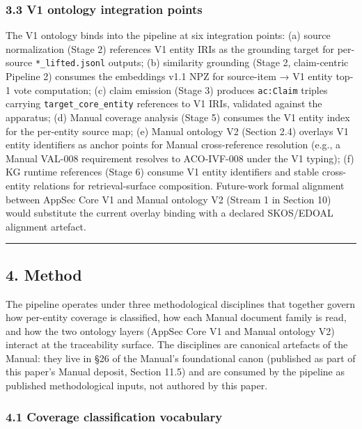 \documentclass[
]{article}
\begin{document}
\subsubsection{3.3 V1 ontology integration
points}\label{v1-ontology-integration-points}

The V1 ontology binds into the pipeline at six integration points: (a)
source normalization (Stage 2) references V1 entity IRIs as the
grounding target for per-source \texttt{*\_lifted.jsonl} outputs; (b)
similarity grounding (Stage 2, claim-centric Pipeline 2) consumes the
embeddings v1.1 NPZ for source-item → V1 entity top-1 vote computation;
(c) claim emission (Stage 3) produces \texttt{ac:Claim} triples carrying
\texttt{target\_core\_entity} references to V1 IRIs, validated against
the apparatus; (d) Manual coverage analysis (Stage 5) consumes the V1
entity index for the per-entity source map; (e) Manual ontology V2
(Section 2.4) overlays V1 entity identifiers as anchor points for Manual
cross-reference resolution (e.g., a Manual VAL-008 requirement resolves
to ACO-IVF-008 under the V1 typing); (f) KG runtime references (Stage 6)
consume V1 entity identifiers and stable cross-entity relations for
retrieval-surface composition. Future-work formal alignment between
AppSec Core V1 and Manual ontology V2 (Stream 1 in Section 10) would
substitute the current overlay binding with a declared SKOS/EDOAL
alignment artefact.

\begin{center}\rule{0.5\linewidth}{0.5pt}\end{center}

\subsection{4. Method}\label{method}

The pipeline operates under three methodological disciplines that
together govern how per-entity coverage is classified, how each Manual
document family is read, and how the two ontology layers (AppSec Core V1
and Manual ontology V2) interact at the traceability surface. The
disciplines are canonical artefacts of the Manual: they live in §26 of
the Manual's foundational canon (published as part of this paper's
Manual deposit, Section 11.5) and are consumed by the pipeline as
published methodological inputs, not authored by this paper.

\subsubsection{4.1 Coverage classification
vocabulary}\label{coverage-classification-vocabulary}
\end{document}
